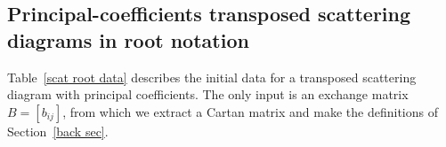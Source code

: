 \documentclass[10pt,a4paper]{amsart}
\theoremstyle{definition}
\DeclareMathOperator{\uf}{uf}
\newcommand\llbracket{[\![}
\newcommand\rrbracket{]\!]}
\newcommand{\integers}{\mathbb Z}
\newcommand{\set}[1]{{\left\lbrace #1 \right\rbrace}}
\newcommand{\m}{\mathbf{m}}
\renewcommand{\k}{\Bbbk}
\newcommand{\hy}{\hat{y}}
\begin{document}
\subsection{Principal-coefficients transposed scattering diagrams in root notation}\label{prin trans sec}
Table~\ref{scat root data} describes the initial data for a transposed scattering diagram with principal coefficients.
The only input is an exchange matrix $B=[b_{ij}]$, from which we extract a Cartan matrix and make the definitions of Section~\ref{back sec}.
\end{document}
